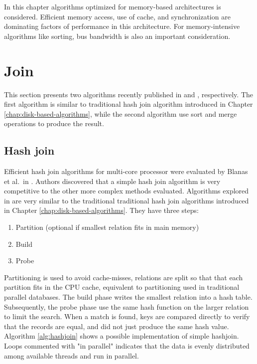 In this chapter algorithms optimized for memory-based architectures is
considered. Efficient memory access, use of cache, and synchronization
are dominating factors of performance in this architecture. For
memory-intensive algorithms like sorting, bus bandwidth is also an
important consideration.

\section{Join}

This section presents two algorithms recently published in
\cite{hashjoin} and \cite{sortmergejoin}, respectively. The first
algorithm is similar to traditional hash join algorithm introduced in
Chapter \ref{chap:disk-based-algorithms}, while the second algorithm
use sort and merge operations to produce the result.

\label{sec:join-algorithms}

\subsection{Hash join}
\label{hashjoin}

Efficient hash join algorithms for multi-core processor were evaluated
by Blanas et al.\ in \cite{hashjoin}. Authors discovered that a simple
hash join algorithm is very competitive to the other more complex
methods evaluated. Algorithms explored in \cite{hashjoin} are very
similar to the traditional traditional hash join algorithms introduced
in Chapter \ref{chap:disk-based-algorithms}. They have three steps:

\begin{enumerate}
	\item Partition (optional if smallest relation fits in main memory)
	\item Build
	\item Probe
\end{enumerate}

Partitioning is used to avoid cache-misses, relations are split so
that that each partition fits in the CPU cache, equivalent to
partitioning used in traditional parallel databases. The build phase
writes the smallest relation into a hash table. Subsequently, the
probe phase use the same hash function on the larger relation to limit
the search. When a match is found, keys are compared directly to
verify that the records are equal, and did not just produce the same
hash value. Algorithm \ref{alg:hashjoin} shows a possible
implementation of simple hashjoin. Loops commented with "in parallel"
indicates that the data is evenly distributed among available threads
and run in parallel.

